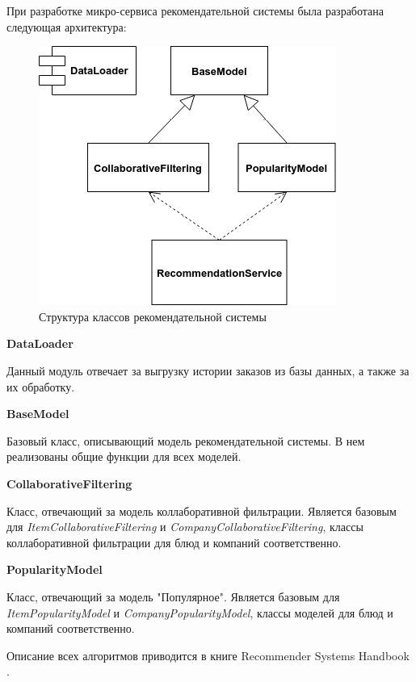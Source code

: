 При разработке микро-сервиса рекомендательной системы была разработана следующая
архитектура:
\begin{figure}[H]
    \centering
    \includegraphics[scale=0.8]{images/classes.png}
    \caption{Структура классов рекомендательной системы}
\end{figure}

\textbf{DataLoader}

Данный модуль отвечает за выгрузку истории заказов из базы данных, а также за
их обработку.

\textbf{BaseModel}

Базовый класс, описывающий модель рекомендательной системы. В нем реализованы общие
функции для всех моделей.

\textbf{CollaborativeFiltering}

Класс, отвечающий за модель коллаборативной фильтрации. Является базовым
для \textit{ItemCollaborativeFiltering} и \textit{CompanyCollaborativeFiltering},
классы коллаборативной фильтрации для блюд и компаний соответственно.

\textbf{PopularityModel}

Класс, отвечающий за модель "Популярное". Является базовым
для \textit{ItemPopularityModel} и \textit{CompanyPopularityModel},
классы моделей для блюд и компаний соответственно.

Описание всех алгоритмов приводится в книге Recommender Systems
Handbook \cite{RSHandbook}.
